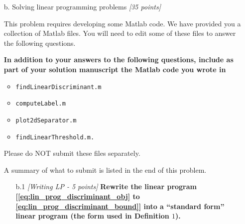 \begin{enumerate}
\begin{enumerate}
\begin{enumerate}
\item [a.3] {\em [5 points]} 
Let $\vec{x_1} \in \mathbb{R}^n$, $\vec{x_1}^T =
\begin{bmatrix}
  1 & 1 & \ldots & 1
\end{bmatrix}$ and $y_1 = 1$. 
Let
$\vec{x_2} \in \mathbb{R}^n$, $\vec{x_2}^T =
\begin{bmatrix}
  -1 & -1 & \ldots & -1
\end{bmatrix}$ and $y_2 = -1$.
The data set $D$ is defined as
\begin{equation*}
    D = \{ (\vec{x_1},y_1), (\vec{x_2},y_2)\}.
\end{equation*}
Consider the formulation in
[\eqref{eq:lin_prog_discriminant_obj} to \eqref{eq:lin_prog_discriminant_bound}]
applied to
$D$. {\bf Show the set of all possible optimal solutions (solve this problem by hand)}.

  \end{enumerate}


\item[b.] Solving linear programming problems {\em [35 points]}

	This problem requires developing some Matlab code.
    We have provided you a collection of Matlab files.
    You will need to edit some of these files to answer the following questions.
    {\bf In addition to your answers to the following questions,
    include as part of your solution manuscript the Matlab code you wrote in 
    \begin{itemize}
      \item {\tt findLinearDiscriminant.m}
      \item {\tt computeLabel.m}
      \item {\tt plot2dSeparator.m}
      \item {\tt findLinearThreshold.m.}
    \end{itemize}
    Please do NOT submit these files 
    separately.} A summary of what to submit is listed in the end of this problem.

  \begin{enumerate}
  \item [b.1] {\em [Writing LP - 5 points]} {\bf Rewrite the linear program
	[\eqref{eq:lin_prog_discriminant_obj} to \eqref{eq:lin_prog_discriminant_bound}]
	  into a ``standard form'' linear program (the form used in Definition $1$).}
      \ \\


\end{enumerate}
\end{enumerate}
\end{enumerate}
